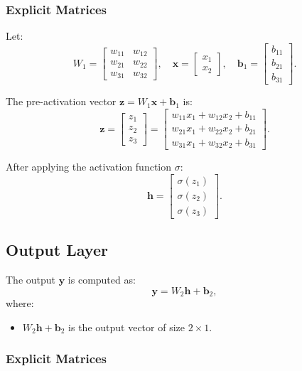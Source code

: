 \begin{notechapter}
\subsubsection{Explicit Matrices}

Let:
\[
W_1 = \begin{bmatrix}
w_{11} & w_{12} \\
w_{21} & w_{22} \\
w_{31} & w_{32}
\end{bmatrix}, \quad
\mathbf{x} = \begin{bmatrix}
x_1 \\
x_2
\end{bmatrix}, \quad
\mathbf{b}_1 = \begin{bmatrix}
b_{11} \\
b_{21} \\
b_{31}
\end{bmatrix}.
\]

The pre-activation vector \( \mathbf{z} = W_1 \mathbf{x} + \mathbf{b}_1 \) is:
\[
\mathbf{z} = \begin{bmatrix}
z_1 \\
z_2 \\
z_3
\end{bmatrix} = \begin{bmatrix}
w_{11}x_1 + w_{12}x_2 + b_{11} \\
w_{21}x_1 + w_{22}x_2 + b_{21} \\
w_{31}x_1 + w_{32}x_2 + b_{31}
\end{bmatrix}.
\]

After applying the activation function \( \sigma \):
\[
\mathbf{h} = \begin{bmatrix}
\sigma(z_1) \\
\sigma(z_2) \\
\sigma(z_3)
\end{bmatrix}.
\]

\subsection{Output Layer}

The output \( \mathbf{y} \) is computed as:
\[
\mathbf{y} = W_2 \mathbf{h} + \mathbf{b}_2,
\]
where:
\begin{itemize}
    \item \( W_2 \mathbf{h} + \mathbf{b}_2 \) is the output vector 
          of size \( 2 \times 1 \).
\end{itemize}

\subsubsection{Explicit Matrices}


\end{notechapter}

